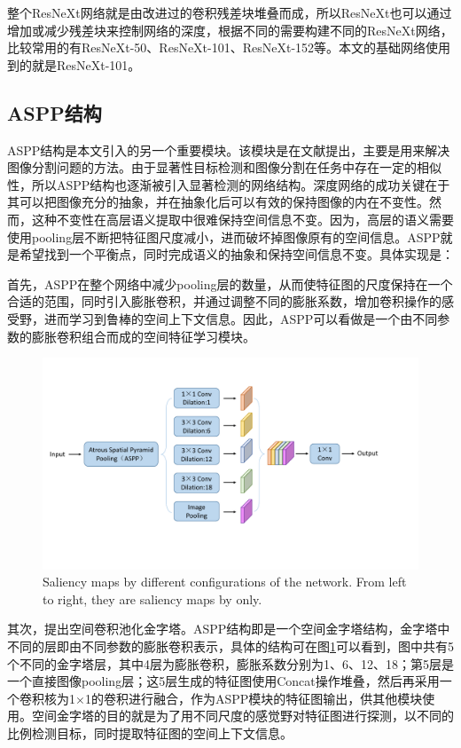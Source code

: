 整个ResNeXt网络就是由改进过的卷积残差块堆叠而成，所以ResNeXt也可以通过增加或减少残差块来控制网络的深度，根据不同的需要构建不同的ResNeXt网络，比较常用的有ResNeXt-50、ResNeXt-101、ResNeXt-152等。本文的基础网络使用到的就是ResNeXt-101。

\subsection{ASPP结构}
ASPP结构是本文引入的另一个重要模块。该模块是在文献\cite{chen2017rethinking}提出，主要是用来解决图像分割问题的方法。由于显著性目标检测和图像分割在任务中存在一定的相似性，所以ASPP结构也逐渐被引入显著检测的网络结构。深度网络的成功关键在于其可以把图像充分的抽象，并在抽象化后可以有效的保持图像的内在不变性。然而，这种不变性在高层语义提取中很难保持空间信息不变。因为，高层的语义需要使用pooling层不断把特征图尺度减小，进而破坏掉图像原有的空间信息。ASPP就是希望找到一个平衡点，同时完成语义的抽象和保持空间信息不变。具体实现是：

首先，ASPP在整个网络中减少pooling层的数量，从而使特征图的尺度保持在一个合适的范围，同时引入膨胀卷积，并通过调整不同的膨胀系数，增加卷积操作的感受野，进而学习到鲁棒的空间上下文信息。因此，ASPP可以看做是一个由不同参数的膨胀卷积组合而成的空间特征学习模块。

\begin{figure}
\center
\includegraphics[width=1\textwidth]{figures/aspp}
\caption{Saliency maps by different configurations of the network. From left to right, they are saliency maps by only.}
\label{aspp}
\end{figure}

其次，提出空间卷积池化金字塔。ASPP结构即是一个空间金字塔结构，金字塔中不同的层即由不同参数的膨胀卷积表示，具体的结构可在图\ref{aspp}可以看到，图中共有5个不同的金字塔层，其中4层为膨胀卷积，膨胀系数分别为1、6、12、18；第5层是一个直接图像pooling层；这5层生成的特征图使用Concat操作堆叠，然后再采用一个卷积核为1$\times$1的卷积进行融合，作为ASPP模块的特征图输出，供其他模块使用。空间金字塔的目的就是为了用不同尺度的感觉野对特征图进行探测，以不同的比例检测目标，同时提取特征图的空间上下文信息。

